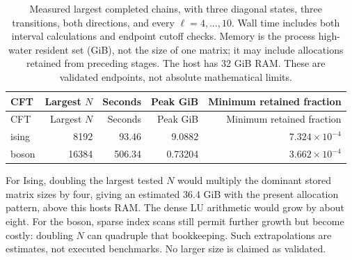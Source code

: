 \begin{longtable}{lrrrr}
\caption{Measured largest completed chains, with three diagonal states, three transitions, both directions, and every $\ell=4,\ldots,10$. Wall time includes both interval calculations and endpoint cutoff checks. Memory is the process high-water resident set (GiB), not the size of one matrix; it may include allocations retained from preceding stages. The host has 32 GiB RAM. These are validated endpoints, not absolute mathematical limits.}
\label{tab:scaling-resources}\\\toprule
CFT & Largest $N$ & Seconds & Peak GiB & Minimum retained fraction\\\midrule
\endfirsthead
\toprule
CFT & Largest $N$ & Seconds & Peak GiB & Minimum retained fraction\\\midrule
\endhead
\bottomrule\endfoot
ising & 8192 & 93.46 & 9.0882 & $7.324\!\times\!10^{-4}$\\
boson & 16384 & 506.34 & 0.73204 & $3.662\!\times\!10^{-4}$\\
\end{longtable}
For Ising, doubling the largest tested $N$ would multiply the dominant stored matrix sizes by four, giving an estimated 36.4 GiB with the present allocation pattern, above this host\textquotesingle s RAM. The dense LU arithmetic would grow by about eight. For the boson, sparse index scans still permit further growth but become costly: doubling $N$ can quadruple that bookkeeping. Such extrapolations are estimates, not executed benchmarks. No larger size is claimed as validated.
